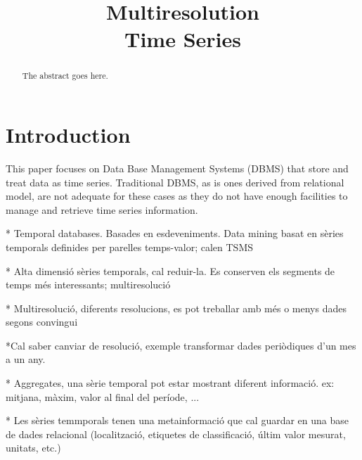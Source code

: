 \documentclass[
conference, %
]{IEEEtran}
\begin{document}
\title{Multiresolution \\ Time Series}


\author{
}


\maketitle


\begin{abstract}
The abstract goes here.
\end{abstract}


\IEEEpeerreviewmaketitle



\section{Introduction}

This paper focuses on Data Base Management Systems (DBMS) that store
and treat data as time series. Traditional DBMS, as is ones derived
from relational model, are not adequate for these cases as they do not
have enough facilities to manage and retrieve time series
information.



* Temporal databases. Basades en esdeveniments. Data mining basat en sèries temporals definides per parelles temps-valor; calen TSMS

* Alta dimensió sèries temporals, cal reduir-la. Es conserven els segments de temps més interessants; multiresolució

* Multiresolució, diferents resolucions, es pot treballar amb més o menys dades segons convingui

*Cal saber canviar de resolució, exemple transformar dades periòdiques d'un mes a un any.

* Aggregates, una sèrie temporal pot estar mostrant diferent informació. ex: mitjana, màxim, valor al final del període, ...

* Les sèries temmporals tenen una metainformació que cal guardar en una base de dades relacional (localització, etiquetes de classificació, últim valor mesurat, unitats, etc.)
\end{document}
